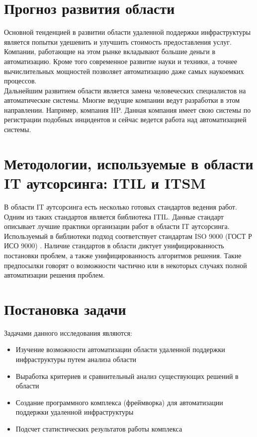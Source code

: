 \section{Прогноз развития области} \label{sect1_2}
Основной тенденцией в развитии области удаленной поддержки инфраструктуры является попытки удешевить и улучшить стоимость предоставления услуг. \\
Компании, работающие на этом рынке вкладывают большие деньги в автоматизацию. Кроме того современное развитие науки и техники, а точнее вычислительных мощностей позволяет автоматизацию даже самых наукоемких процессов. \\
Дальнейшим развитием области является замена человеческих специалистов на автоматические системы. Многие ведущие компании ведут разработки в этом направлении. Например, компания HP. Данная компания имеет свою системы по регистрации подобных инцидентов и сейчас ведется работа над автоматизацией системы. \\

\section{Методологии, используемые в области IT аутсорсинга: ITIL и ITSM} \label{sect1_3}
В области IT аутсорсинга есть несколько готовых стандартов ведения работ. Одним из таких стандартов является библиотека ITIL. Данные стандарт описывает лучшие практики организации работ в области IT аутсорсинга. Используемый в библиотеки подход соответствует стандартам ISO 9000 (ГОСТ Р ИСО 9000) .
Наличие стандартов в области диктует унифицированность постановки проблем, а также унифицированность алгоритмов решения. Такие предпосылки говорят о возможности частично или в некоторых случаях полной автоматизации решения проблем.
\section{Постановка задачи} \label{sect1_4}
Задачами данного исследования являются:
\begin{itemize}
	\item Изучение возможности автоматизации области удаленной поддержки инфраструктуры путем анализа области
	\item Выработка критериев и сравнительный анализ существующих решений в области
	\item Создание программного комплекса (фреймворка) для автоматизации поддержки удаленной инфраструктуры
	\item Подсчет статистических результатов работы комплекса
\end{itemize}



\clearpage
